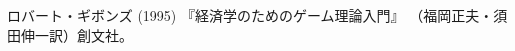 \documentclass[main.tex]{subfiles}
\begin{document}
\newpage
{}
\begin{thebibliography}{99}

\item ロバート・ギボンズ (1995) 『経済学のためのゲーム理論入門』
（福岡正夫・須田伸一訳）創文社。


\end{thebibliography}
\end{document}
